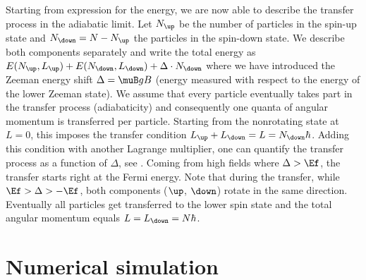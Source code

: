
Starting from expression  for the energy, we are now able to describe the transfer process in the adiabatic limit. Let $N_\up$ be the number of particles in the spin-up state and $N_\down = N-N_\up$ the particles in the spin-down state. We describe both components separately and write the total energy as
$E(N_\up,L_\up) + E(N_\down,L_\down) + \Delta\cdot N_\down$
where we have introduced the Zeeman energy shift $\Delta=\muB g B$ (energy measured with respect to the energy of the lower Zeeman state). We assume that every particle eventually takes part in the transfer process (adiabaticity) and consequently one quanta of angular momentum is transferred per particle. Starting from the nonrotating state at $L=0$, this imposes the transfer condition $L_\up + L_\down = L = N_\down\hbar$. Adding this condition with another Lagrange multiplier, one can quantify the transfer process as a function of $\Delta$, see . Coming from high fields where $\Delta > \Ef$, the transfer starts right at the Fermi energy. Note that during the transfer, while $\Ef > \Delta > -\Ef$, both components ($\up$, $\down$) rotate in the same direction. Eventually all particles get transferred to the lower spin state and the total angular momentum equals $L=L_\down=N\hbar$.

\section{Numerical simulation}

